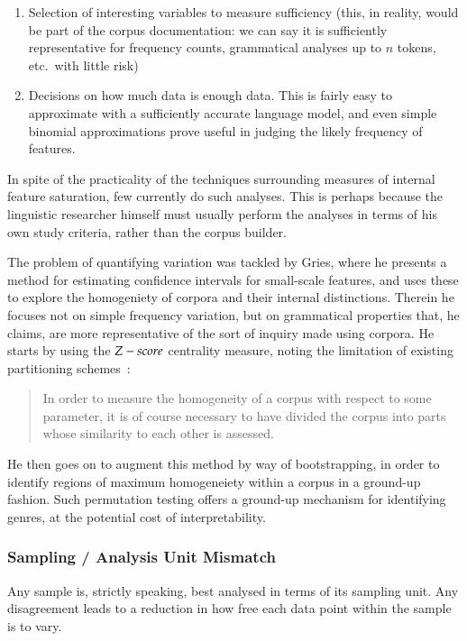 \begin{enumerate}
 \item Selection of interesting variables to measure sufficiency (this, in reality, would be part of the corpus documentation: we can say it is sufficiently representative for frequency counts, grammatical analyses up to $n$ tokens, etc.\ with little risk)
 \item Decisions on how much data is enough data.  This is fairly easy to approximate with a sufficiently accurate language model, and even simple binomial approximations prove useful in judging the likely frequency of features.
\end{enumerate}

In spite of the practicality of the techniques surrounding measures of internal feature saturation, few currently do such analyses.  This is perhaps because the linguistic researcher himself must usually perform the analyses in terms of his own study criteria, rather than the corpus builder.

The problem of quantifying variation was tackled by Gries\cite{gries2006exploring}, where he presents a method for estimating confidence intervals for small-scale features, and uses these to explore the homogeniety of corpora and their internal distinctions.  Therein he focuses not on simple frequency variation, but on grammatical properties that, he claims, are more representative of the sort of inquiry made using corpora.  He starts by using the $Z\--\-score$ centrality measure, noting the limitation of existing partitioning schemes~\cite[p.123]{gries2006exploring}:

\begin{quote}
In order to measure the homogeneity of a corpus with respect to some parameter, it is of course necessary to have divided the corpus into parts whose similarity to each other is assessed. 
\end{quote}

He then goes on to augment this method by way of bootstrapping, in order to identify regions of maximum homogeneiety within a corpus in a ground-up fashion.  Such permutation testing offers a ground-up mechanism for identifying genres, at the potential cost of interpretability.




\subsubsection{Sampling / Analysis Unit Mismatch}
Any sample is, strictly speaking, best analysed in terms of its sampling unit.  Any disagreement leads to a reduction in how free each data point within the sample is to vary\cite{kilgarriff2005language,lijffijt2014significance,paquot2009distinctive}.

